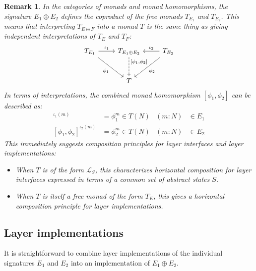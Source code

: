 \documentclass[11pt,oneside]{book}
\newtheorem{remark}[theorem]{Remark}
\theoremstyle{definition}
\begin{document}
\begin{remark}
In the categories of monads and monad homomorphisms,
the signature $E_1 \oplus E_2$ defines the coproduct
of the free monads $T_{E_1}$ and $T_{E_2}$.
This means that interpreting $T_{E \oplus F}$ into a monad $T$
is the same thing as giving independent interpretations
of $T_E$ and $T_F$:
\[
  \begin{tikzcd}[row sep=large]
    T_{E_1} \ar[r, "\iota_1"] \ar[dr, "\phi_1"'] &
    T_{E_1 \oplus E_2}
      \ar[d, "{[\phi_1, \phi_2]}", dashed, near start] &
    T_{E_2} \ar[l, "\iota_2"'] \ar[dl, "\phi_2"]
    \\
    & T &
  \end{tikzcd}
\]
In terms of interpretations,
the combined monad homomorphism $[\phi_1, \phi_2]$
can be described as:
\begin{align*}
  [\phi_1, \phi_2]^{\iota_1(m)} &= \phi_1^m \in T(N)
    & (m \mathbin: N) &\in E_1 \\
  [\phi_1, \phi_2]^{\iota_2(m)} &= \phi_2^m \in T(N)
    & (m \mathbin: N) &\in E_2
\end{align*}
This immediately suggests composition principles
for layer interfaces and layer implementations:
\begin{itemize}
  \item
    When $T$ is of the form $\mathcal{L}_S$,
    this characterizes horizontal composition for layer interfaces
    expressed in terms of a common set of abstract states $S$.
  \item
    When $T$ is itself a free monad of the form $T_E$,
    this gives a horizontal composition principle
    for layer implementations.
\end{itemize}
\end{remark}


\subsection{Layer implementations} %

It is straightforward
to combine layer implementations
of the individual signatures $E_1$ and $E_2$
into an implementation of $E_1 \oplus E_2$.
\end{document}
